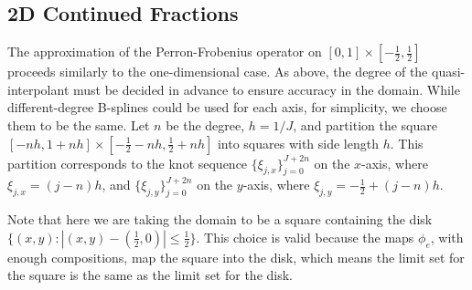 \documentclass[10pt]{article}
\theoremstyle{definition}
\numberwithin{equation}{section}
\numberwithin{figure}{section}
\numberwithin{table}{section}
\begin{document}
\clearpage
\subsection{2D Continued Fractions}

The approximation of the Perron-Frobenius operator on $[0,1]\times[-\frac{1}{2},\frac{1}{2}]$ proceeds similarly to the one-dimensional case. As above, the degree of the quasi-interpolant must be decided in advance to ensure accuracy in the domain. While different-degree B-splines could be used for each axis, for simplicity, we choose them to be the same. Let $n$ be the degree, $h=1/J$, and partition the square $[-nh,1+nh]\times[-\frac{1}{2}-nh,\frac{1}{2}+nh]$ into squares with side length $h$. This partition corresponds to the knot sequence $\{\xi_{j,x}\}_{j=0}^{J+2n}$ on the $x$-axis, where $\xi_{j,x}=(j-n)h$, and $\{\xi_{j,y}\}_{j=0}^{J+2n}$ on the $y$-axis, where $\xi_{j,y}=-\frac{1}{2}+(j-n)h$. %

Note that here we are taking the domain to be a square containing the disk $\{(x,y):|(x,y)-(\frac{1}{2},0)|\leq\frac{1}{2}\}$. This choice is valid because the maps $\phi_e$, with enough compositions, map the square into the disk, which means the limit set for the square is the same as the limit set for the disk.
\end{document}
